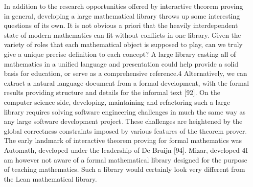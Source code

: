 \documentclass{book}
\theoremstyle{definition}
\begin{document}
In addition to the research opportunities offered by interactive theorem proving in general, developing a large mathematical library throws up some interesting questions of its own. It is not obvious a priori that the heavily interdependent state of modern mathematics can fit without conflicts in one library. Given the variety of roles that each mathematical object is supposed to play, can we truly give a unique precise definition to each concept? A large library casting all of mathematics in a unified language and presentation could help provide a solid basis for education, or serve as a comprehensive reference.4 Alternatively, we can extract a natural language document from a formal development, with the formal results providing structure and details for the informal text [92]. On the computer science side, developing, maintaining and refactoring such a large library requires solving software engineering challenges in much the same way as any large software development project. These challenges are heightened by the global correctness constraints imposed by various features of the theorem prover.
The early landmark of interactive theorem proving for formal mathematics was Automath, developed under the leadership of De Bruijn [94]. Mizar, developed
4I am however not aware of a formal mathematical library designed for the purpose of teaching mathematics. Such a library would certainly look very different from the Lean mathematical library.
\end{document}
